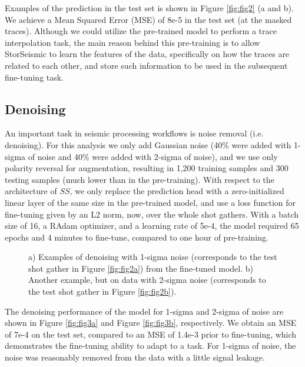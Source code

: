 \documentclass{article}
\begin{document}
Examples of the prediction in the test set is shown in Figure \ref{fig:fig2} (a and b). We achieve a Mean Squared Error (MSE) of 8e-5 in the test set (at the masked traces). Although we could utilize the pre-trained model to perform a trace interpolation task, the main reason behind this pre-training is to allow StorSeismic to learn the features of the data, specifically on how the traces are related to each other, and store such information to be used in the subsequent fine-tuning task.

\subsection{Denoising}
An important task in seismic processing workflows is noise removal (i.e. denoising). For this analysis we only add Gaussian noise (40\% were added with 1-sigma of noise and 40\% were added with 2-sigma of noise), and we use only polarity reversal for augmentation, resulting in 1,200 training samples and 300 testing samples (much lower than in the pre-training). With respect to the architecture of $SS$, we only replace the prediction head with a zero-initialized linear layer of the same size in the pre-trained model, and use a loss function for fine-tuning given by an L2 norm, now, over the whole shot gathers. With a batch size of 16, a RAdam optimizer, and a learning rate of 5e-4, the model required 65 epochs and 4 minutes to fine-tune, compared to one hour of pre-training.

\begin{figure}[h]
    \centering
    \caption{a) Examples of denoising with 1-sigma noise (corresponds to the test shot gather in Figure \ref{fig:fig2a}) from the fine-tuned model. b) Another example, but on data with 2-sigma noise (corresponds to the test shot gather in Figure \ref{fig:fig2b}).}
    \label{fig:fig3}
\end{figure}

The denoising performance of the model for 1-sigma and 2-sigma of noise are shown in Figure \ref{fig:fig3a} and Figure \ref{fig:fig3b}, respectively. We obtain an MSE of 7e-4 on the test set, compared to an MSE of 1.4e-3 prior to fine-tuning, which demonstrates the fine-tuning ability to adapt to a task. For 1-sigma of noise, the noise was reasonably removed from the data with a little signal leakage. 
\end{document}
